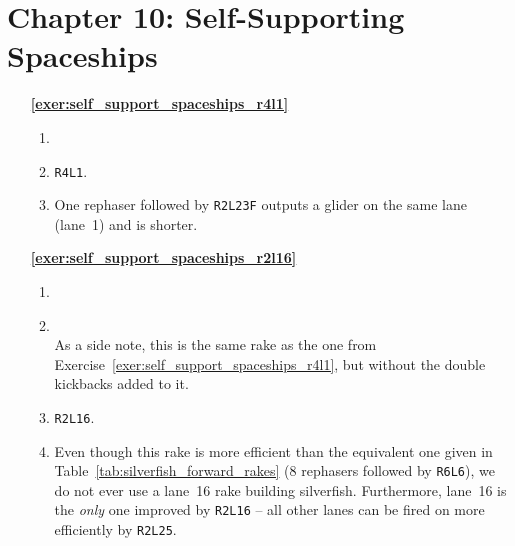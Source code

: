 \clearpage


\hypertarget{solutions_self_support_spaceships}{}\label{solutions_self_support_spaceships}
\section*{Chapter 10: Self-Supporting Spaceships}
\renewcommand{\chapterfolder}{self_support_spaceships/}

\begin{multicols}{2}
	\begin{itemize}[leftmargin=0em]
		\item[\bf\color{ocre}\sffamily\ref{exer:self_support_spaceships_r4l1}] \begin{enumerate}[leftmargin=1.5em,label=\bf\color{ocre}(\alph*)]
			\item {} \\
			
			\item \texttt{R4L1}.
			
			\item One rephaser followed by \texttt{R2L23F} outputs a glider on the same lane (lane~1) and is shorter.\\
		\end{enumerate}
		
		
		\item[\bf\color{ocre}\sffamily\ref{exer:self_support_spaceships_r2l16}] \begin{enumerate}[leftmargin=1.5em,label=\bf\color{ocre}(\alph*)]
			\item {} \\
			
			\item {} \\
			
			As a side note, this is the same rake as the one from Exercise~\ref{exer:self_support_spaceships_r4l1}, but without the double kickbacks added to it.
			
			\item \texttt{R2L16}.
			
			\item Even though this rake is more efficient than the equivalent one given in Table~\ref{tab:silverfish_forward_rakes} (8 rephasers followed by \texttt{R6L6}), we do not ever use a lane~16 rake building silverfish. Furthermore, lane~16 is the \emph{only} one improved by \texttt{R2L16} -- all other lanes can be fired on more efficiently by \texttt{R2L25}.\\
		\end{enumerate}
	

\end{itemize}
\end{multicols}
